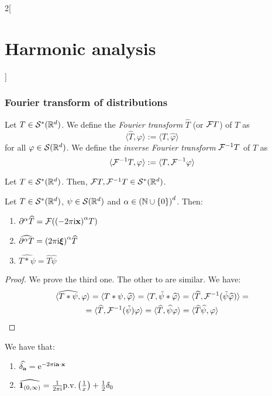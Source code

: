 \documentclass[../../../main_math.tex]{subfiles}
\begin{document}
\begin{multicols}{2}[\section{Harmonic analysis}]
  \subsubsection{Fourier transform of distributions}
  \begin{definition}
    Let $T\in \mathcal{S}^*(\mathbb{R}^d)$. We define the \emph{Fourier transform} $\widehat{T}$ (or $\mathcal{F}{T}$) of $T$ as
    $$
      \langle \widehat{T},\varphi\rangle:=\langle T,\widehat{\varphi}\rangle
    $$
    for all $\varphi\in \mathcal{S}(\mathbb{R}^d)$. We define the \emph{inverse Fourier transform} $\mathcal{F}^{-1}{T}$ of $T$ as
    $$
      \langle \mathcal{F}^{-1}{T},\varphi\rangle:=\langle T,\mathcal{F}^{-1}{\varphi}\rangle
    $$
  \end{definition}
  \begin{lemma}
    Let $T\in \mathcal{S}^*(\mathbb{R}^d)$. Then, $\mathcal{F}{T},\mathcal{F}^{-1}T\in \mathcal{S}^*(\mathbb{R}^d)$.
  \end{lemma}
  \begin{proposition}
    Let $T\in \mathcal{S}^*(\mathbb{R}^d)$, $\psi \in \mathcal{S}(\mathbb{R}^d)$ and $\alpha\in{(\ensuremath{\mathbb{N}}\cup\{0\})}^d$. Then:
    \begin{enumerate}
      \item $\partial^\alpha\widehat{T}=\mathcal{F}({{(-2\pi\mathrm{i} \boldsymbol{\mathrm{x}})}^{\alpha} T})$
      \item $\widehat{\partial^\alpha T}={(2\pi\mathrm{i} \boldsymbol{\mathrm{\xi}})}^{\alpha}\widehat{T}$
      \item $\widehat{T*\psi}=\widehat{T}\widehat{\psi}$
    \end{enumerate}
  \end{proposition}
  \begin{proof}
    We prove the third one. The other to are similar. We have:
    \begin{multline*}
      \langle \widehat{T*\psi},\varphi\rangle=\langle T*\psi,\widehat{\varphi}\rangle=\langle T,\tilde\psi*\widehat{\varphi}\rangle=\langle \widehat{T},\mathcal{F}^{-1}(\tilde{\psi}\widehat{\varphi})\rangle=\\
      =\langle \widehat{T},\mathcal{F}^{-1}(\tilde{\psi})\varphi\rangle=\langle \widehat{T},\widehat{\psi}\varphi\rangle=\langle \widehat{T}\widehat{\psi},\varphi\rangle
    \end{multline*}
  \end{proof}
  \begin{lemma}\label{HA:lemma_propdelta}
    We have that:
    \begin{enumerate}
      \item $\widehat{\delta_{\boldsymbol{\mathrm{a}}}}=\mathrm{e}^{-2\pi\mathrm{i} \boldsymbol{\mathrm{a}}\cdot\boldsymbol{\mathrm{x}}}$
      \item $\widehat{\boldsymbol{\mathrm{1}}_{(0,\infty)}}=\frac{1}{2\pi\mathrm{i}}\mathrm{p.v.}\left(\frac{1}{x}\right)+\frac{1}{2}\delta_0$

\end{enumerate}
\end{lemma}
\end{multicols}
\end{document}
